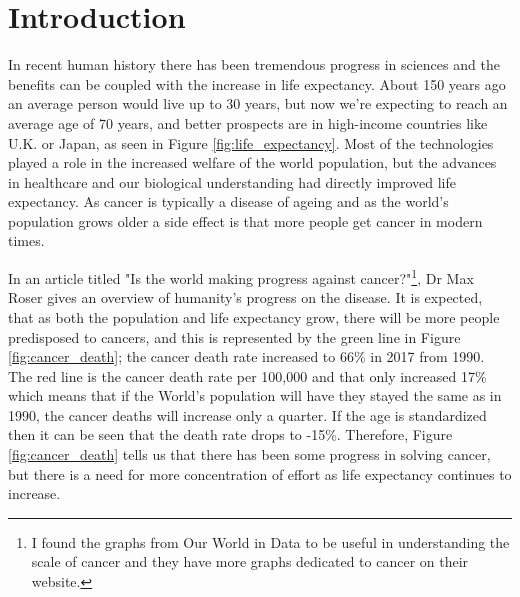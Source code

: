 
\chapter{Introduction}

In recent human history there has been tremendous progress in sciences and the benefits can be coupled with the increase in life expectancy. About 150 years ago an average person would live up to 30 years, but now we're expecting to reach an average age of 70 years, and better prospects are in high-income countries like U.K. or Japan, as seen in Figure \ref{fig:life_expectancy}. Most of the technologies played a role in the increased welfare of the world population, but the advances in healthcare and our biological understanding had directly improved life expectancy. As cancer is typically a disease of ageing and as the world's population grows older a side effect is that more people get cancer in modern times.

In an article titled "Is the world making progress against cancer?"\cite{World_in_Data_undated-gc}\footnote{I found the graphs from Our World in Data to be useful in understanding the scale of cancer and they have more graphs dedicated to cancer on their website\cite{Roser2015-qb}. }, Dr Max Roser gives an overview of humanity's progress on the disease. It is expected, that as both the population and life expectancy grow, there will be more people predisposed to cancers, and this is represented by the green line in Figure \ref{fig:cancer_death}; the cancer death rate increased to 66\% in 2017 from 1990. The red line is the cancer death rate per 100,000 and that only increased 17\% which means that if the World's population will have they stayed the same as in 1990, the cancer deaths will increase only a quarter. If the age is standardized then it can be seen that the death rate drops to -15\%. Therefore, Figure \ref{fig:cancer_death} tells us that there has been some progress in solving cancer, but there is a need for more concentration of effort as life expectancy continues to increase.

